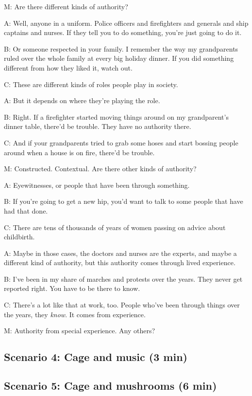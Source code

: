 \documentclass[17pt]{extarticle}
\begin{document}
M:  Are there different kinds of authority?

A:  Well, anyone in a uniform.  Police officers and firefighters and generals and ship captains and nurses.  If they tell you to do something, you're just going to do it.

B:  Or someone respected in your family.  I remember the way my grandparents ruled over the whole family at every big holiday dinner.  If you did something different from how they liked it, watch out.

C:  These are different kinds of roles people play in society.

A:  But it depends on where they're playing the role.

B:  Right.  If a firefighter started moving things around on my grandparent's dinner table, there'd be trouble.  They have no authority there.

C:  And if your grandparents tried to grab some hoses and start bossing people around when a house is on fire, there'd be trouble.

M:  Constructed.  Contextual.  Are there other kinds of authority?

A:  Eyewitnesses, or people that have been through something.

B:  If you're going to get a new hip, you'd want to talk to some people that have had that done.

C:  There are tens of thousands of years of women passing on advice about childbirth.

A:  Maybe in those cases, the doctors and nurses are the experts, and maybe a different kind of authority, but this authority comes through lived experience.

B:  I've been in my share of marches and protests over the years.  They never get reported right.  You have to be there to know.

C:  There's a lot like that at work, too.  People who've been through things over the years, they \textit{know}.  It comes from experience.

M:  Authority from special experience.  Any others?

\newpage

\subsection{Scenario 4: Cage and music (3 min)}

\newpage

\subsection{Scenario 5: Cage and mushrooms (6 min)}
\end{document}
